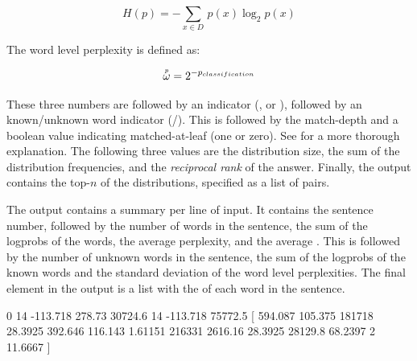 \documentclass[a4paper,10pt,twoside]{report}
\begin{document}
\begin{equation}
H(p) = -\sum_{x \in D} \, p(x)\log_2 p(x)
\label{eq:entropy}
\end{equation}

The word level perplexity is defined as:

\begin{equation}
\accentset{p}{\omega}{} = 2^{-p_{classification}}
\label{eq:wlp}
\end{equation}

These three numbers are followed by an indicator (, 
or ), followed by an known/unknown word indicator
(/). This is followed by the match-depth and a boolean
value indicating matched-at-leaf (one or zero). See
\cite{Daelemans+09} for a more thorough explanation. The following
three values are the distribution size, the sum of the distribution
frequencies, and the \emph{reciprocal rank} of the answer. Finally,
the output contains the top-$n$ of the distributions, specified as a
list of  pairs.

The  output contains a summary per line of input. It
contains the sentence number, followed by the number of words in the
sentence, the sum of the logprobs of the words, the average
perplexity, and the average \wlp{}. This is followed by
the number of unknown words in the sentence, the sum of the logprobs
of the known words and the standard deviation of the word level
perplexities. The final element in the output is a list with the
\wlp{} of each word in the sentence.

\begin{wout}{}
0 14 -113.718 278.73 30724.6 14 -113.718 75772.5 [ 594.087 105.375
                     181718 28.3925 392.646 116.143 1.61151 216331
                     2616.16 28.3925 28129.8 68.2397 2 11.6667 ]
\end{wout}
\end{document}
